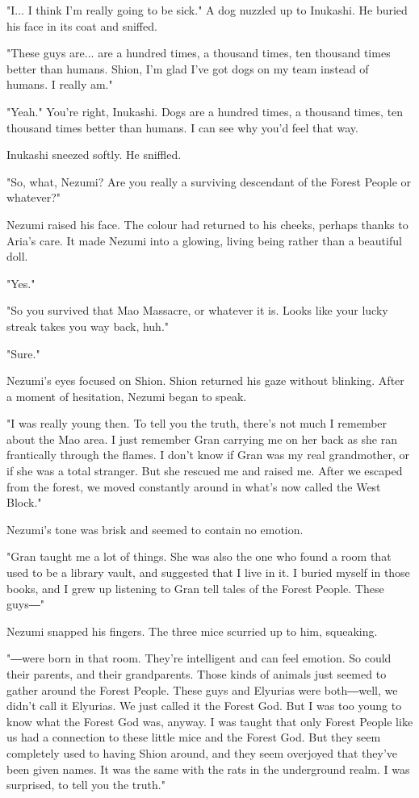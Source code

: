 "I... I think I'm really going to be sick." A dog nuzzled up to
Inukashi. He buried his face in its coat and sniffed.

"These guys are... are a hundred times, a thousand times, ten thousand
times better than humans. Shion, I'm glad I've got dogs on my team
instead of humans. I really am."

"Yeah." You're right, Inukashi. Dogs are a hundred times, a thousand
times, ten thousand times better than humans. I can see why you'd feel
that way.

Inukashi sneezed softly. He sniffled.

"So, what, Nezumi? Are you really a surviving descendant of the Forest
People or whatever?"

Nezumi raised his face. The colour had returned to his cheeks, perhaps
thanks to Aria's care. It made Nezumi into a glowing, living being
rather than a beautiful doll.

"Yes."

"So you survived that Mao Massacre, or whatever it is. Looks like your
lucky streak takes you way back, huh."

"Sure."

Nezumi's eyes focused on Shion. Shion returned his gaze without
blinking. After a moment of hesitation, Nezumi began to speak.

"I was really young then. To tell you the truth, there's not much I
remember about the Mao area. I just remember Gran carrying me on her
back as she ran frantically through the flames. I don't know if Gran was
my real grandmother, or if she was a total stranger. But she rescued me
and raised me. After we escaped from the forest, we moved constantly
around in what's now called the West Block."

Nezumi's tone was brisk and seemed to contain no emotion.

"Gran taught me a lot of things. She was also the one who found a room
that used to be a library vault, and suggested that I live in it. I
buried myself in those books, and I grew up listening to Gran tell tales
of the Forest People. These guys―"

Nezumi snapped his fingers. The three mice scurried up to him,
squeaking.

"―were born in that room. They're intelligent and can feel emotion. So
could their parents, and their grandparents. Those kinds of animals just
seemed to gather around the Forest People. These guys and Elyurias were
both―well, we didn't call it Elyurias. We just called it the Forest God.
But I was too young to know what the Forest God was, anyway. I was
taught that only Forest People like us had a connection to these little
mice and the Forest God. But they seem completely used to having Shion
around, and they seem overjoyed that they've been given names. It was
the same with the rats in the underground realm. I was surprised, to
tell you the truth."

